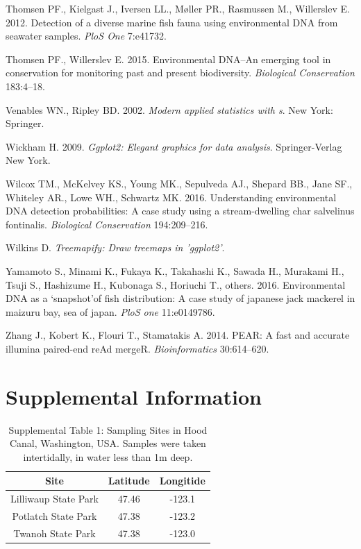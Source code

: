 \documentclass[fleqn,10pt,lineno]{wlpeerj} %
\begin{document}
\hypertarget{ref-thomsen_detection_2012}{}
Thomsen PF., Kielgast J., Iversen LL., Møller PR., Rasmussen M.,
Willerslev E. 2012. Detection of a diverse marine fish fauna using
environmental DNA from seawater samples. \emph{PloS One} 7:e41732.

\hypertarget{ref-thomsen2015environmental}{}
Thomsen PF., Willerslev E. 2015. Environmental DNA--An emerging tool in
conservation for monitoring past and present biodiversity.
\emph{Biological Conservation} 183:4--18.

\hypertarget{ref-MASS}{}
Venables WN., Ripley BD. 2002. \emph{Modern applied statistics with s}.
New York: Springer.

\hypertarget{ref-ggplot}{}
Wickham H. 2009. \emph{Ggplot2: Elegant graphics for data analysis}.
Springer-Verlag New York.

\hypertarget{ref-wilcox2016understanding}{}
Wilcox TM., McKelvey KS., Young MK., Sepulveda AJ., Shepard BB., Jane
SF., Whiteley AR., Lowe WH., Schwartz MK. 2016. Understanding
environmental DNA detection probabilities: A case study using a
stream-dwelling char salvelinus fontinalis. \emph{Biological
Conservation} 194:209--216.

\hypertarget{ref-treemapify}{}
Wilkins D. \emph{Treemapify: Draw treemaps in 'ggplot2'}.

\hypertarget{ref-yamamoto2016environmental}{}
Yamamoto S., Minami K., Fukaya K., Takahashi K., Sawada H., Murakami H.,
Tsuji S., Hashizume H., Kubonaga S., Horiuchi T., others. 2016.
Environmental DNA as a `snapshot'of fish distribution: A case study of
japanese jack mackerel in maizuru bay, sea of japan. \emph{PloS one}
11:e0149786.

\hypertarget{ref-zhang2014pear}{}
Zhang J., Kobert K., Flouri T., Stamatakis A. 2014. PEAR: A fast and
accurate illumina paired-end reAd mergeR. \emph{Bioinformatics}
30:614--620.

\newpage

\section{Supplemental Information}\label{supplemental-information}

\begin{table}[!ht]

\caption*{\label{tab:Supplement_GPScoordinatesSamplingAreas}Supplemental Table 1: Sampling Sites in Hood Canal, Washington, USA. Samples were taken intertidally, in water less than 1m deep.}
\centering
\begin{tabular}[t]{c|c|c}
\hline
Site & Latitude & Longitide\\
\hline
Lilliwaup State Park & 47.46 & -123.1\\
\hline
Potlatch State Park & 47.38 & -123.2\\
\hline
Twanoh State Park & 47.38 & -123.0\\
\hline
\end{tabular}
\end{table}
\end{document}
